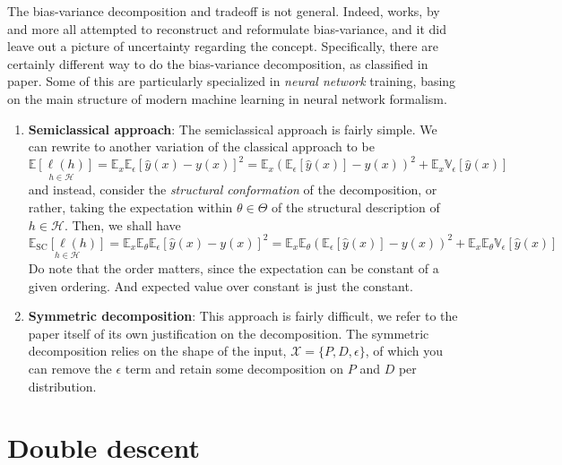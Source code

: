 The bias-variance decomposition and tradeoff is not general. Indeed, works, by \cite{6797087,sharma_bias-variance_2014,domingos_unifeid_2000,adlam2020understandingdoubledescentrequires,yang_rethinking_2020} and more all attempted to reconstruct and reformulate bias-variance, and it did leave out a picture of uncertainty regarding the concept. Specifically, there are certainly different way to do the bias-variance decomposition, as classified in \cite{adlam2020understandingdoubledescentrequires} paper. Some of this are particularly specialized in \textit{neural network} training, basing on the main structure of modern machine learning in neural network formalism. 
\begin{enumerate}[leftmargin=1cm,itemsep=2pt,topsep=1pt]
    \item \textbf{Semiclassical approach}: The semiclassical approach is fairly simple. We can rewrite to another variation of the classical approach to be \begin{equation}
        \underset{h\in\mathcal{H}}{\mathbb{E}[\ell(h)]} = \mathbb{E}_{x}\mathbb{E}_{\epsilon}\left[\hat{y}(x)-y(x)\right]^{2} = \mathbb{E}_{x}\left(\mathbb{E}_{\epsilon}[\hat{y}(x)]-y(x)\right)^{2} + \mathbb{E}_{x}\mathbb{V}_{\epsilon}\left[\hat{y}(x)\right]  
    \end{equation}
    and instead, consider the \textit{structural conformation} of the decomposition, or rather, taking the expectation within $\theta\in \Theta$ of the structural description of $h\in\mathcal{H}$. Then, we shall have 
    \begin{equation}
        \underset{h\in\mathcal{H}}{\mathbb{E}_{\mathrm{SC}}[\ell(h)]} = \mathbb{E}_{x}\mathbb{E}_{\theta}\mathbb{E}_{\epsilon}\left[\hat{y}(x)-y(x)\right]^{2} = \mathbb{E}_{x}\mathbb{E}_{\theta}\left(\mathbb{E}_{\epsilon}[\hat{y}(x)]-y(x)\right)^{2} + \mathbb{E}_{x}\mathbb{E}_{\theta}\mathbb{V}_{\epsilon}\left[\hat{y}(x)\right]
    \end{equation}
    Do note that the order matters, since the expectation can be constant of a given ordering. And expected value over constant is just the constant. 
    \item \textbf{Symmetric decomposition}: This approach is fairly difficult, we refer to the paper itself of its own justification on the decomposition. The symmetric decomposition relies on the shape of the input, $\mathcal{X}=\{P,D,\epsilon\}$, of which you can remove the $\epsilon$ term and retain some decomposition on $P$ and $D$ per distribution. 
\end{enumerate}
\section{Double descent}
